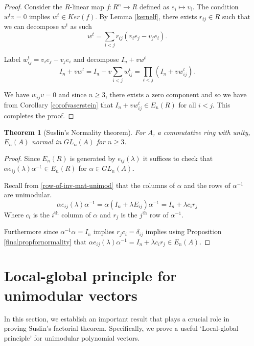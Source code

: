 \documentclass[12pt]{report}
\numberwithin{equation}{section}
\newcounter{dummy} \numberwithin{dummy}{section}
\newtheorem{theorem}[dummy]{Theorem}
\newtheorem{proposition}[dummy]{Proposition}
\begin{document}
		\begin{proof}
			Consider the $R$-linear map $f:R^n \to R$ defined as $e_i \mapsto v_i$. The condition $w^tv = 0 $ implies $w^t \in Ker(f)$. By Lemma \ref{kernelf}, there exists $r_{ij} \in R$ such that we can decompose $w^t$ as such
			\[
			w^t = \sum_{i<j} r_{ij}(v_ie_j - v_je_i).
			\]
			
			Label $w_{ij}^t = v_ie_j - v_je_i$ and decompose $I_n+vw^t$ 
			\[
			I_n + vw^t = I_n + v\sum_{i<j} w_{ij}^t = \prod_{i<j}(I_n + vw_{ij}^t).
			\]
			
			We have $w_{ij}v=0$ and since $n \geq 3$, there exists a zero component and so we have from Corollary \ref{corofvaserstein} that $I_n + vw_{ij}^t \in E_n(R)$ for all $i < j$. This completes the proof.
		\end{proof}
	
	\begin{theorem}[Suslin's Normality theorem]
		For $A$, a commutative ring with unity, $E_n(A)$ normal in $GL_n(A)$ for $n \geq 3$. 
	\end{theorem}
	\begin{proof}
		Since $E_n(R)$ is generated by $e_{ij} (\lambda) $ it suffices to check that $\alpha e_{ij}(\lambda) \alpha^{-1} \in E_n(R)$ for $\alpha \in GL_n(A)$.
		
		 Recall from \ref{row-of-inv-mat-unimod} that the columns of $\alpha$ and the rows of $\alpha^{-1}$ are unimodular.
		\[ \alpha e_{ij} (\lambda ) \alpha^{-1}= \alpha(I_n+\lambda E_{ij}) \alpha^{-1} = I_n +\lambda c_i r_j\]
		Where $c_i$ is the $i^\mathrm{th}$ column of $\alpha$ and $r_j$ is the $j^{\mathrm{th}}$ row of $\alpha^{-1}$.
		
		Furthermore since $\alpha^{-1}\alpha =I_n $ implies $r_jc_i=\delta_{ij} $ implies using Proposition \ref{finalpropfornormality} that $\alpha e_{ij}(\lambda) \alpha^{-1} = I_n + \lambda c_i r_j \in E_n(A)$.
	\end{proof}
	
		\section{Local-global principle for unimodular vectors}
		In this section, we establish an important result that plays a crucial role in proving Suslin’s factorial theorem. Specifically, we prove a useful `Local-global principle' for unimodular polynomial vectors.
		
\end{document}
